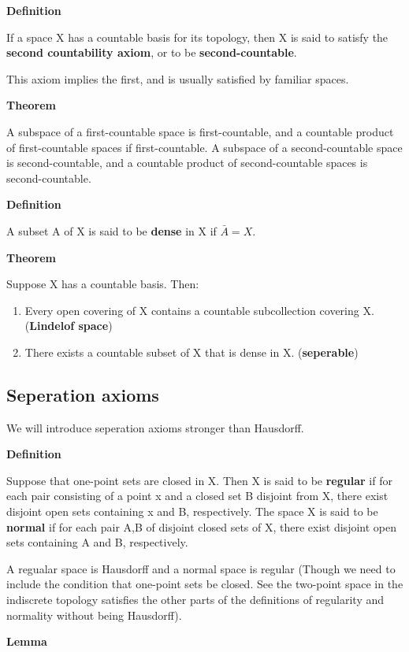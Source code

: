 \documentclass[11pt]{article}
\begin{document}
\textbf{Definition}

If a space X has a countable basis for its topology, then X is said to satisfy the \textbf{second countability axiom}, or to be \textbf{second-countable}.


This axiom implies the first, and is usually satisfied by familiar spaces.

\textbf{Theorem}

A subspace of a first-countable space is first-countable, and a countable product of first-countable spaces if first-countable. A subspace of a second-countable space is second-countable, and a countable product of second-countable spaces is second-countable.

\textbf{Definition}

A subset A of X is said to be \textbf{dense} in X if \(\bar{A} = X\).

\textbf{Theorem}

Suppose X has a countable basis. Then:
\begin{enumerate}
\item Every open covering of X contains a countable subcollection covering X. (\textbf{Lindelof space})
\item There exists a countable subset of X that is dense in X. (\textbf{seperable})
\end{enumerate}


\subsection{Seperation axioms}
\label{sec:org49d98d2}

We will introduce seperation axioms stronger than Hausdorff.

\textbf{Definition}

Suppose that one-point sets are closed in X. Then X is said to be \textbf{regular} if for each pair consisting of a point x and a closed set B disjoint from X, there exist disjoint open sets containing x and B, respectively. The space X is said to be \textbf{normal} if for each pair A,B of disjoint closed sets of X, there exist disjoint open sets containing A and B, respectively.

A regualar space is Hausdorff and a normal space is regular (Though we need to include the condition that one-point sets be closed. See the two-point space in the indiscrete topology satisfies the other parts of the definitions of regularity and normality without being Hausdorff).

\textbf{Lemma}
\end{document}

